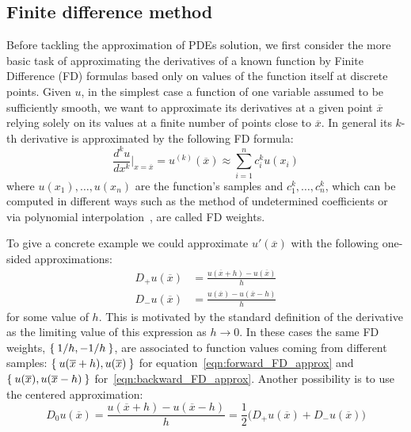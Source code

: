 
\subsection{Finite difference method}
\label{subsec:finite_difference_methods}

Before tackling the approximation of PDEs solution, we first consider the more basic task of approximating the derivatives of a known function by Finite Difference (FD) formulas based only on values of the function itself at discrete points. Given $u$, in the simplest case a function of one variable assumed to be sufficiently smooth, we want to approximate its derivatives at a given point $\overline{x}$ relying solely on its values at a finite number of points close to $\overline{x}$. In general its $k$-th derivative is approximated by the following FD formula:
\begin{equation}
	\frac{d^k u}{dx^k}\bigg|_{x=\overline{x}} = u^{(k)}(\overline{x}) \approx \sum_{i=1}^{n} c_{i}^{k} u(x_i)
\end{equation}
where $u(x_1), \dots, u(x_n)$ are the function's samples and $c_{1}^{k}, \dots, c_{n}^{k}$, which can be computed in different ways such as the method of undetermined coefficients or via polynomial interpolation~\cite{LeVeque:FD_book}, are called FD weights.

\smallskip
To give a concrete example we could approximate $u'(\overline{x})$ with the following one-sided approximations:
\begin{subequations}
	\begin{align}
		D_+ u(\overline{x}) & = \frac{u(\overline{x}+h) - u(\overline{x})}{h}  \label{eqn:forward_FD_approx}\\
		D_- u(\overline{x}) & = \frac{u(\overline{x}) - u(\overline{x}-h)}{h}  \label{eqn:backward_FD_approx}
	\end{align}
\end{subequations}
for some value of $ h$. This is motivated by the standard definition of the derivative as the limiting value of this expression as $h \to 0$. In these cases the same FD weights, $\Set{1/h, - 1/h}$, are associated to function values coming from different samples: $\Set{u(\overline{x}+h), u(\overline{x})}$ for equation~\eqref{eqn:forward_FD_approx} and $\Set{u(\overline{x}), u(\overline{x}-h)}$ for~\eqref{eqn:backward_FD_approx}. Another possibility is to use the centered approximation:
\begin{equation}
	D_0 u(\overline{x}) = \frac{u(\overline{x}+h) - u(\overline{x}-h)}{h} = \frac{1}{2} \bigl( D_+ u(\overline{x}) + D_- u(\overline{x}) \bigr)
\end{equation}

